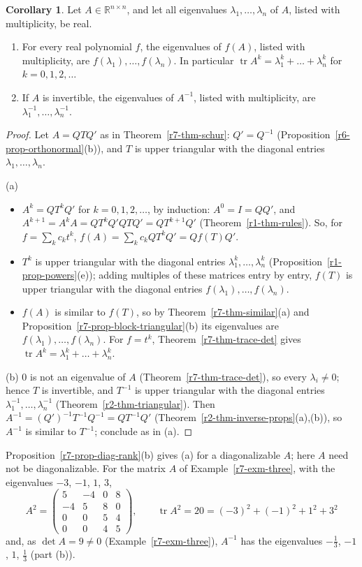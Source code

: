 \documentclass[12pt]{article}
\newcommand{\R}{\mathbb R}
\DeclareMathOperator{\tr}{tr}
\theoremstyle{definition}
\newtheorem{corollary}[theorem]{Corollary}
\begin{document}
\begin{corollary}\label{r7-cor-schur}
Let \(A\in\R^{n\times n}\), and let all eigenvalues \(\lambda_1,\dots,\lambda_n\) of \(A\), listed with multiplicity, be
real.
\begin{enumerate}
\item For every real polynomial \(f\), the eigenvalues of \(f(A)\), listed with multiplicity, are
\(f(\lambda_1),\dots,f(\lambda_n)\). In particular \(\tr A^k=\lambda_1^k+\dots+\lambda_n^k\) for \(k=0,1,2,\dots\)
\item If \(A\) is invertible, the eigenvalues of \(A^{-1}\), listed with multiplicity, are
\(\lambda_1^{-1},\dots,\lambda_n^{-1}\).
\end{enumerate}
\end{corollary}
\begin{proof}
Let \(A=QTQ'\) as in Theorem~\ref{r7-thm-schur}: \(Q'=Q^{-1}\) (Proposition~\ref{r6-prop-orthonormal}(b)), and \(T\) is
upper triangular with the diagonal entries \(\lambda_1,\dots,\lambda_n\).

(a)
\begin{itemize}
\item \(A^k=QT^kQ'\) for \(k=0,1,2,\dots\), by induction: \(A^0=I=QQ'\), and \(A^{k+1}=A^kA=QT^kQ'QTQ'=QT^{k+1}Q'\)
(Theorem~\ref{r1-thm-rules}). So, for \(f=\sum_kc_kt^k\), \(f(A)=\sum_kc_kQT^kQ'=Qf(T)Q'\).
\item \(T^k\) is upper triangular with the diagonal entries \(\lambda_1^k,\dots,\lambda_n^k\)
(Proposition~\ref{r1-prop-powers}(e)); adding multiples of these matrices entry by entry, \(f(T)\) is upper triangular
with the diagonal entries \(f(\lambda_1),\dots,f(\lambda_n)\).
\item \(f(A)\) is similar to \(f(T)\), so by Theorem~\ref{r7-thm-similar}(a) and
Proposition~\ref{r7-prop-block-triangular}(b) its eigenvalues are \(f(\lambda_1),\dots,f(\lambda_n)\). For \(f=t^k\),
Theorem~\ref{r7-thm-trace-det} gives \(\tr A^k=\lambda_1^k+\dots+\lambda_n^k\).
\end{itemize}
(b) \(0\) is not an eigenvalue of \(A\) (Theorem~\ref{r7-thm-trace-det}), so every \(\lambda_i\ne0\); hence \(T\) is
invertible, and \(T^{-1}\) is upper triangular with the diagonal entries \(\lambda_1^{-1},\dots,\lambda_n^{-1}\)
(Theorem~\ref{r2-thm-triangular}). Then \(A^{-1}=(Q')^{-1}T^{-1}Q^{-1}=QT^{-1}Q'\)
(Theorem~\ref{r2-thm-inverse-props}(a),(b)), so \(A^{-1}\) is similar to \(T^{-1}\); conclude as in (a).
\end{proof}
Proposition~\ref{r7-prop-diag-rank}(b) gives (a) for a diagonalizable \(A\); here \(A\) need not be diagonalizable.
For the matrix \(A\) of Example~\ref{r7-exm-three}, with the eigenvalues \(-3\), \(-1\), \(1\), \(3\),
\[
A^2=\begin{pmatrix}5&-4&0&8\\-4&5&8&0\\0&0&5&4\\0&0&4&5\end{pmatrix},\qquad\tr A^2=20=(-3)^2+(-1)^2+1^2+3^2
\]
and, as \(\det A=9\ne0\) (Example~\ref{r7-exm-three}), \(A^{-1}\) has the eigenvalues \(-\frac13\), \(-1\), \(1\), \(\frac13\) (part (b)).
\end{document}
